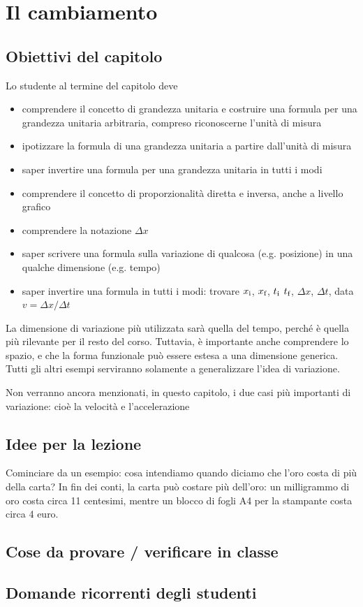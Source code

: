\documentclass[11pt]{report}
\begin{document}
\chapter{Il cambiamento}

\section*{Obiettivi del capitolo}
Lo studente al termine del capitolo deve
\begin{itemize}
    \item comprendere il concetto di grandezza unitaria e costruire una formula per una grandezza unitaria arbitraria, compreso riconoscerne l'unità di misura
    \item ipotizzare la formula di una grandezza unitaria a partire dall'unità di misura
    \item saper invertire una formula per una grandezza unitaria in tutti i modi
    \item comprendere il concetto di proporzionalità diretta e inversa, anche a livello grafico
    \item comprendere la notazione $\Delta x$
    \item saper scrivere una formula sulla variazione di qualcosa (e.g. posizione) in una qualche dimensione (e.g. tempo)
    \item saper invertire una formula in tutti i modi: trovare $x_{\textup{i}}$, $x_{\textup{f}}$, $t_{\textup{i}}$ $t_{\textup{f}}$, $\Delta x$, $\Delta t$, data $v=\Delta x/\Delta t$
\end{itemize}
La dimensione di variazione più utilizzata sarà quella del tempo, perché è quella più rilevante per il resto del corso. Tuttavia, è importante anche comprendere lo spazio, e che la forma funzionale può essere estesa a una dimensione generica. Tutti gli altri esempi serviranno solamente a generalizzare l'idea di variazione.

Non verranno ancora menzionati, in questo capitolo, i due casi più importanti di variazione: cioè la velocità e l'accelerazione

\section*{Idee per la lezione}
Cominciare da un esempio: cosa intendiamo quando diciamo che l'oro costa di più della carta? In fin dei conti, la carta può costare più dell'oro: un milligrammo di oro costa circa 11 centesimi, mentre un blocco di fogli A4 per la stampante costa circa 4 euro.


\section*{Cose da provare / verificare in classe}

\section*{Domande ricorrenti degli studenti}
\end{document}
